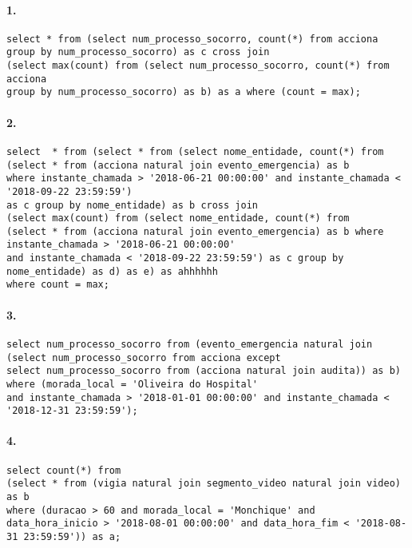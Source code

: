 \documentclass[10pt,a4paper]{article}
\begin{document}
\paragraph{1.}
\begin{verbatim}
select * from (select num_processo_socorro, count(*) from acciona 
group by num_processo_socorro) as c cross join 
(select max(count) from (select num_processo_socorro, count(*) from acciona 
group by num_processo_socorro) as b) as a where (count = max);
\end{verbatim}

\paragraph{2.}
\begin{verbatim}
select  * from (select * from (select nome_entidade, count(*) from 
(select * from (acciona natural join evento_emergencia) as b 
where instante_chamada > '2018-06-21 00:00:00' and instante_chamada < '2018-09-22 23:59:59')
as c group by nome_entidade) as b cross join 
(select max(count) from (select nome_entidade, count(*) from 
(select * from (acciona natural join evento_emergencia) as b where instante_chamada > '2018-06-21 00:00:00' 
and instante_chamada < '2018-09-22 23:59:59') as c group by nome_entidade) as d) as e) as ahhhhhh
where count = max;

\end{verbatim}

\paragraph{3.}
\begin{verbatim}
select num_processo_socorro from (evento_emergencia natural join 
(select num_processo_socorro from acciona except 
select num_processo_socorro from (acciona natural join audita)) as b) 
where (morada_local = 'Oliveira do Hospital' 
and instante_chamada > '2018-01-01 00:00:00' and instante_chamada < '2018-12-31 23:59:59');
\end{verbatim}

\paragraph{4.}
\begin{verbatim}
select count(*) from 
(select * from (vigia natural join segmento_video natural join video) as b 
where (duracao > 60 and morada_local = 'Monchique' and
data_hora_inicio > '2018-08-01 00:00:00' and data_hora_fim < '2018-08-31 23:59:59')) as a;
\end{verbatim}
\end{document}
